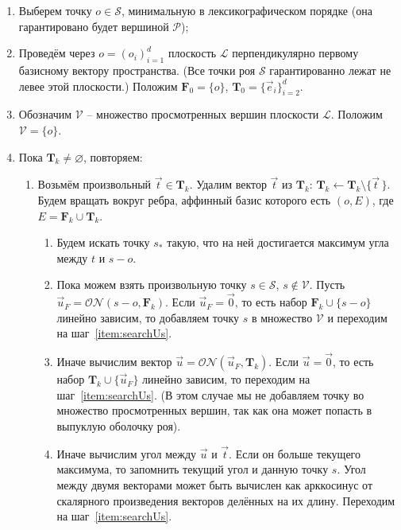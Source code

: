 \documentclass[a4paper,12pt]{article}
\newcommand{\Swarm}{\mathcal{S}}              %
\newcommand{\Polytop}{\mathcal{P}}         %
\newcommand{\Viewed}{\mathcal{V}}             %
\newcommand{\ZVec}{\vec 0}                    %
\newcommand{\set}[2][]{#1\{ #2 #1\}}                    %
\newcommand{\ONorm}[3][]{\mathcal{ON}#1( #2, #3 #1)} %
\newcommand{\TempVec}{\mathbf{T}}  %
\newcommand{\FinalVec}{\mathbf{F}} %
\newcommand{\Plane}{\mathcal{L}}           %
\renewcommand{\.}{\hspace{0.2ex}}
\begin{document}
    \begin{enumerate}
      \item Выберем точку $o \in \Swarm$, минимальную в лексикографическом порядке (она гарантировано будет вершиной $\Polytop$);


      \item Проведём через $o=(o_i)_{i = 1}^{d}$ плоскость $\Plane$ перпендикулярно первому базисному вектору пространства. (Все точки роя $\Swarm$ гарантированно лежат не левее этой плоскости.) Положим $\FinalVec_0 = \set{o}$, $\TempVec_0 = \set{\vec e_i}_{i=2}^d$.


      \item Обозначим $\Viewed$ -- множество просмотренных вершин плоскости $\Plane$. Положим $\Viewed =\set{o}$.


      \item Пока $\TempVec_k \neq \varnothing$, повторяем:


      \begin{enumerate}
        \item Возьмём произвольный $\vec t \in \TempVec_k$. Удалим вектор $\vec t$ из $\TempVec_k$: $\TempVec_k \leftarrow \TempVec_k \setminus \set{\vec t \,}$. Будем вращать вокруг ребра, аффинный базис которого есть $(o, E)$, где $E = \FinalVec_k \cup \TempVec_k$.


        \begin{enumerate}
          \item Будем искать точку $s_*$ такую, что на ней достигается максимум угла между $t$ и $s - o$.


          \item Пока можем взять произвольную точку $s \in \Swarm$, $s \notin \Viewed$. Пусть $\vec u_F = \ONorm{s - o}{\FinalVec_k}$. Если $\vec u_F = \ZVec$, то есть набор $\FinalVec_k \cup \set{s - o}$ линейно зависим, то добавляем точку $s$ в множество $\Viewed$ и переходим на шаг~\ref{item:searchUs}.
          \label{item:searchUs}


          \item Иначе вычислим вектор $\vec u = \ONorm{\vec u_F}{\TempVec_k}$. Если $\vec u = \ZVec$, то есть набор $\TempVec_k \cup \set{\vec u_F}$ линейно зависим, то переходим на шаг~\ref{item:searchUs}. (В этом случае мы не добавляем точку во множество просмотренных вершин, так как она может попасть в выпуклую оболочку роя).


          \item Иначе вычислим угол между $\vec u$ и $\vec t$. Если он больше текущего максимума, то запомнить текущий угол и данную точку $s$. Угол между двумя векторами может быть вычислен как арккосинус от скалярного произведения векторов делённых на их длину. Переходим на шаг~\ref{item:searchUs}.
        \end{enumerate}



\end{enumerate}
\end{enumerate}
\end{document}
